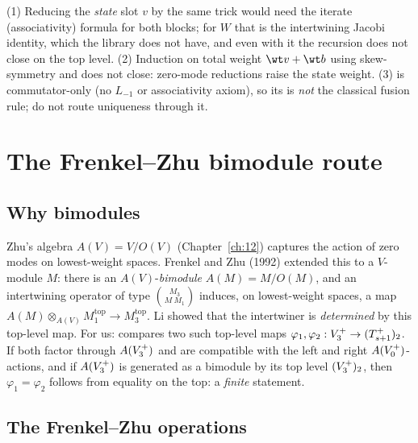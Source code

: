 \begin{warning}[title={Trap / dead end: Dead ends on the way to finiteness}]
(1) Reducing the \emph{state} slot $v$ by the same trick would need the iterate (associativity)
formula for both blocks; for $W$ that is the intertwining Jacobi identity, which the library does not
have, and even with it the recursion does not close on the top level.  (2) Induction on total weight
$\wt v+\wt b$ using skew-symmetry and  does not close: zero-mode reductions raise the
state weight.  (3)  is commutator-only (no $L_{-1}$ or associativity
axiom), so its  is \emph{not} the classical fusion rule; do not route uniqueness
through it.
\end{warning}

\section{The Frenkel--Zhu bimodule route}\label{ch14:sec:fz}

\subsection{Why bimodules}

Zhu's algebra $A(V)=V/O(V)$ (Chapter~\ref{ch:12}) captures the action of zero modes on lowest-weight
spaces.  Frenkel and Zhu (1992) extended this to a $V$-module $M$: there is an $A(V)$-\emph{bimodule}
$A(M)=M/O(M)$, and an intertwining operator of type $\binom{M_3}{M\ M_1}$ induces, on lowest-weight
spaces, a map $A(M)\otimes_{A(V)}M_1^{\mathrm{top}}\to M_3^{\mathrm{top}}$.  Li showed that the
intertwiner is \emph{determined} by this top-level map.  For us:  compares two such
top-level maps $\varphi_1,\varphi_2:V_3^{+}\to(T_{s+1}^+)_2$.  If both factor through $A(V_3^{+})$ and are
compatible with the left and right $A(V_0^{+})$-actions, and if $A(V_3^{+})$ is generated as a bimodule by
its top level $(V_3^{+})_2$, then $\varphi_1=\varphi_2$ follows from equality on the top: a \emph{finite}
statement.

\subsection{The Frenkel--Zhu operations}

